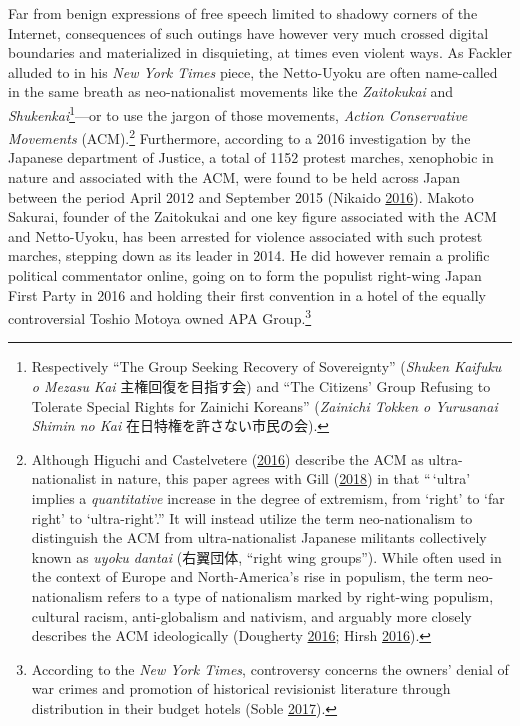 \documentclass[10pt,british,A4paper,twoside]{memoir}
\begin{document}
Far from benign expressions of free speech limited to shadowy corners of
the Internet, consequences of such outings have however very much
crossed digital boundaries and materialized in disquieting, at times
even violent ways. As Fackler alluded to in his \emph{New York Times}
piece, the Netto-Uyoku are often name-called in the same breath as
neo-nationalist movements like the \emph{Zaitokukai} and
\emph{Shukenkai}\footnote{Respectively ``The Group Seeking Recovery of
  Sovereignty'' (\emph{Shuken Kaifuku o Mezasu Kai} 主権回復を目指す会)
  and ``The Citizens' Group Refusing to Tolerate Special Rights for
  Zainichi Koreans'' (\emph{Zainichi Tokken o Yurusanai Shimin no Kai}
  在日特権を許さない市民の会).}---or to use the jargon of those
movements, \emph{Action Conservative Movements} (ACM).\footnote{Although
  Higuchi and Castelvetere
  (\protect\hyperlink{ref-higuchi_japans_2016}{2016}) describe the ACM
  as ultra-nationalist in nature, this paper agrees with Gill
  (\protect\hyperlink{ref-gill_nativist_2018}{2018}) in that ``\,`ultra'
  implies a \emph{quantitative} increase in the degree of extremism,
  from `right' to `far right' to `ultra-right'.'' It will instead
  utilize the term neo-nationalism to distinguish the ACM from
  ultra-nationalist Japanese militants collectively known as \emph{uyoku
  dantai} (右翼団体, ``right wing groups''). While often used in the
  context of Europe and North-America's rise in populism, the term
  neo-nationalism refers to a type of nationalism marked by right-wing
  populism, cultural racism, anti-globalism and nativism, and
  arguably more closely describes the ACM ideologically (Dougherty
  \protect\hyperlink{ref-dougherty_new_2016}{2016}; Hirsh
  \protect\hyperlink{ref-hirsh_why_2016}{2016}).} Furthermore, according
to a 2016 investigation by the Japanese department of Justice, a total
of 1152 protest marches, xenophobic in nature and associated with the
ACM, were found to be held across Japan between the period April 2012
and September 2015 (Nikaido
\protect\hyperlink{ref-nikaido_eng:_2016}{2016}). Makoto Sakurai,
founder of the Zaitokukai and one key figure associated with the ACM and
Netto-Uyoku, has been arrested for violence associated with such protest
marches, stepping down as its leader in 2014. He did however remain a
prolific political commentator online, going on to form the populist
right-wing Japan First Party in 2016 and holding their first convention in
a hotel of the equally controversial Toshio Motoya owned APA
Group.\footnote{According to the \emph{New York Times}, controversy
  concerns the owners' denial of war crimes and promotion of historical
  revisionist literature through distribution in their budget hotels
  (Soble \protect\hyperlink{ref-soble_right-wing_2017}{2017}).}
\end{document}

